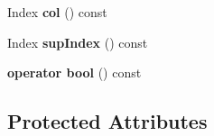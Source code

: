 \begin{DoxyCompactItemize}
Index {\bfseries col} () const
\item 
\mbox{\label{class_eigen_1_1internal_1_1_mapped_super_nodal_matrix_1_1_inner_iterator_a7bfb531fe20340f7c44caab705701c22}} 
Index {\bfseries sup\+Index} () const
\item 
\mbox{\label{class_eigen_1_1internal_1_1_mapped_super_nodal_matrix_1_1_inner_iterator_aa82ceae26b3f2079bbfcaf6464cea433}} 
{\bfseries operator bool} () const
\end{DoxyCompactItemize}
\subsection*{Protected Attributes}
